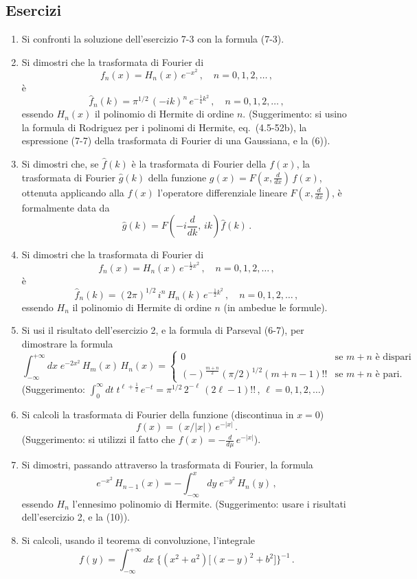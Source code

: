 \documentclass[11pt, a4paper]{book}
\numberwithin{equation}{section}
\newenvironment{esercizi}{\subsection*{Esercizi}\begin{enumerate}}{\end{enumerate}}
\begin{document}
\begin{esercizi}
\item Si confronti la soluzione dell'esercizio 7-3 con la formula (7-3).

\item Si dimostri che la trasformata di Fourier di
\[
  f_n(x) = H_n(x)\,e^{-x^2}\,,\quad n=0,1,2,\ldots\,,
\]
è
\[
  \hat{f}_n(k) = \pi^{1/2}\,(-ik)^n\,e^{-\frac{1}{4}k^2}\,,\quad n=0,1,2,\ldots\,,
\]
essendo $H_n(x)$ il polinomio di Hermite di ordine $n$. (Suggerimento: si usino la formula di Rodriguez per i polinomi di Hermite, eq.\ (4.5-52b), la espressione (7-7) della trasformata di Fourier di una Gaussiana, e la (6)).

\item Si dimostri che, se $\hat{f}(k)$ è la trasformata di Fourier della $f(x)$, la trasformata di Fourier $\hat{g}(k)$ della funzione $g(x) = F(x,\frac{d}{dx})\,f(x)$, ottenuta applicando alla $f(x)$ l'operatore differenziale lineare $F(x,\frac{d}{dx})$, è formalmente data da
\[
  \hat{g}(k) = F\!\left(-i\frac{d}{dk},\,ik\right)\hat{f}(k)\,.
\]

\item[*] Si dimostri che la trasformata di Fourier di
\[
  f_n(x) = H_n(x)\,e^{-\frac{1}{2}x^2}\,,\quad n=0,1,2,\ldots\,,
\]
è
\[
  \hat{f}_n(k) = (2\pi)^{1/2}\,i^n\,H_n(k)\,e^{-\frac{1}{2}k^2}\,,\quad n=0,1,2,\ldots\,,
\]
essendo $H_n$ il polinomio di Hermite di ordine $n$ (in ambedue le formule).

\item Si usi il risultato dell'esercizio 2, e la formula di Parseval (6-7), per dimostrare la formula
\[
  \int_{-\infty}^{+\infty} dx\;e^{-2x^2}\,H_m(x)\,H_n(x)
  = \begin{cases} 0 & \text{se } m+n \text{ è dispari} \\
    (-)^{\frac{m+n}{2}}(\pi/2)^{1/2}(m+n-1)!! & \text{se } m+n \text{ è pari.}
  \end{cases}
\]
(Suggerimento: $\int_0^\infty dt\;t^{\ell+\frac{1}{2}}\,e^{-t} = \pi^{1/2}\,2^{-\ell}\,(2\ell-1)!!\,$, $\ell=0,1,2,\ldots$)

\item Si calcoli la trasformata di Fourier della funzione (discontinua in $x=0$)
\[
  f(x) = (x/|x|)\,e^{-|x|}\,.
\]
(Suggerimento: si utilizzi il fatto che $f(x) = -\frac{d}{d\mu}\,e^{-|x|}$).

\item Si dimostri, passando attraverso la trasformata di Fourier, la formula
\[
  e^{-x^2}\,H_{n-1}(x) = -\int_{-\infty}^{x} dy\;e^{-y^2}\,H_n(y)\,,
\]
essendo $H_n$ l'ennesimo polinomio di Hermite. (Suggerimento: usare i risultati dell'esercizio 2, e la (10)).

\item Si calcoli, usando il teorema di convoluzione, l'integrale
\[
  f(y) = \int_{-\infty}^{+\infty} dx\;\bigl\{(x^2+a^2)\bigl[(x-y)^2+b^2\bigr]\bigr\}^{-1}\,.
\]
\end{esercizi}
\end{document}
